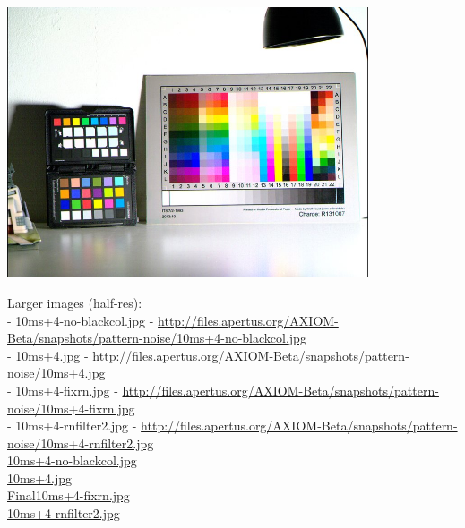 \begin{center}
\includegraphics[height=8cm]{images/10ms+4-rnfilter2-small}
\end{center}

Larger images (half-res): \\

- 10ms+4-no-blackcol.jpg - \href{http://files.apertus.org/AXIOM-Beta/snapshots/pattern-noise/10ms+4-no-blackcol.jpg}{http://files.apertus.org/AXIOM-Beta/snapshots/pattern-noise/10ms+4-no-blackcol.jpg}\\
- 10ms+4.jpg - \href{http://files.apertus.org/AXIOM-Beta/snapshots/pattern-noise/10ms+4.jpg}{http://files.apertus.org/AXIOM-Beta/snapshots/pattern-noise/10ms+4.jpg}\\
- 10ms+4-fixrn.jpg - \href{http://files.apertus.org/AXIOM-Beta/snapshots/pattern-noise/10ms+4-fixrn.jpg}{http://files.apertus.org/AXIOM-Beta/snapshots/pattern-noise/10ms+4-fixrn.jpg}\\
- 10ms+4-rnfilter2.jpg - \href{http://files.apertus.org/AXIOM-Beta/snapshots/pattern-noise/10ms+4-rnfilter2.jpg}{http://files.apertus.org/AXIOM-Beta/snapshots/pattern-noise/10ms+4-rnfilter2.jpg} \\

\href{http://files.apertus.org/AXIOM-Beta/snapshots/pattern-noise/10ms+4-no-blackcol.jpg}{10ms+4-no-blackcol.jpg}\\
\href{http://files.apertus.org/AXIOM-Beta/snapshots/pattern-noise/10ms+4.jpg}{10ms+4.jpg}\\
\href{http://files.apertus.org/AXIOM-Beta/snapshots/pattern-noise/10ms+4-fixrn.jpg}{Final10ms+4-fixrn.jpg}\\
\href{http://files.apertus.org/AXIOM-Beta/snapshots/pattern-noise/10ms+4-rnfilter2.jpg}{10ms+4-rnfilter2.jpg}\\

